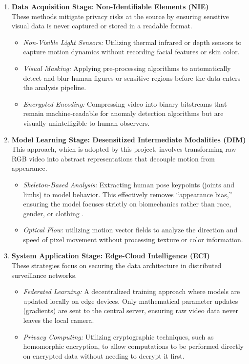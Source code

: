 \documentclass[12pt]{article}
\begin{document}
\begin{enumerate}
    \item \textbf{Data Acquisition Stage: Non-Identifiable Elements (NIE)} \\
    These methods mitigate privacy risks at the source by ensuring sensitive visual data is never captured or stored in a readable format.
    \begin{itemize}
        \item \textit{Non-Visible Light Sensors:} Utilizing thermal infrared or depth sensors to capture motion dynamics without recording facial features or skin color.
        \item \textit{Visual Masking:} Applying pre-processing algorithms to automatically detect and blur human figures or sensitive regions before the data enters the analysis pipeline.
        \item \textit{Encrypted Encoding:} Compressing video into binary bitstreams that remain machine-readable for anomaly detection algorithms but are visually unintelligible to human observers.
    \end{itemize}

    \item \textbf{Model Learning Stage: Desensitized Intermediate Modalities (DIM)} \\
    This approach, which is adopted by this project, involves transforming raw RGB video into abstract representations that decouple motion from appearance.
    \begin{itemize}
        \item \textit{Skeleton-Based Analysis:} Extracting human pose keypoints (joints and limbs) to model behavior. This effectively removes ``appearance bias,'' ensuring the model focuses strictly on biomechanics rather than race, gender, or clothing \citep{pang2024detecting}.
        \item \textit{Optical Flow:} utilizing motion vector fields to analyze the direction and speed of pixel movement without processing texture or color information.
    \end{itemize}

    \item \textbf{System Application Stage: Edge-Cloud Intelligence (ECI)} \\
    These strategies focus on securing the data architecture in distributed surveillance networks.
    \begin{itemize}
        \item \textit{Federated Learning:} A decentralized training approach where models are updated locally on edge devices. Only mathematical parameter updates (gradients) are sent to the central server, ensuring raw video data never leaves the local camera.
        \item \textit{Privacy Computing:} Utilizing cryptographic techniques, such as homomorphic encryption, to allow computations to be performed directly on encrypted data without needing to decrypt it first.
    \end{itemize}
\end{enumerate}
\end{document}
